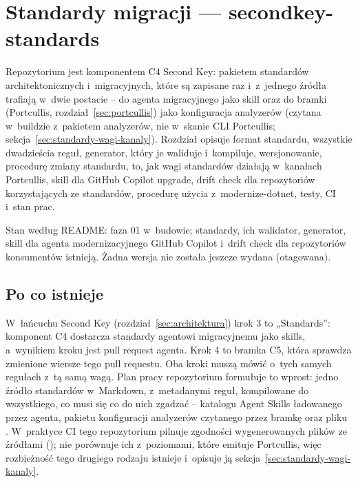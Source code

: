 \section{Standardy migracji --- secondkey-standards}\label{sec:standardy}

Repozytorium  jest komponentem C4 Second Key:
pakietem standardów architektonicznych i~migracyjnych, które są zapisane raz i~z~jednego
źródła trafiają w~dwie postacie -- do agenta migracyjnego jako skill oraz do bramki
(Portcullis, rozdział~\ref{sec:portcullis}) jako konfiguracja analyzerów (czytana w~buildzie
z~pakietem analyzerów, nie w~skanie CLI Portcullis; sekcja~\ref{sec:standardy-wagi-kanaly}).
Rozdział opisuje format standardu, wszystkie dwadzieścia reguł, generator, który je waliduje
i~kompiluje, wersjonowanie, procedurę zmiany standardu, to, jak wagi standardów działają
w~kanałach Portcullis, skill dla GitHub Copilot upgrade, drift check dla repozytoriów
korzystających ze standardów, procedurę użycia z~modernize-dotnet, testy, CI i~stan prac.

Stan według README: faza 01 w~budowie; standardy, ich walidator, generator, skill dla agenta
modernizacyjnego GitHub Copilot i~drift check dla repozytoriów konsumentów istnieją. Żadna
wersja nie została jeszcze wydana (otagowana).


\subsection{Po co istnieje}\label{sec:standardy-cel}

W~łańcuchu Second Key (rozdział~\ref{sec:architektura}) krok 3 to „Standards”: komponent C4
dostarcza standardy agentowi migracyjnemu jako skills, a~wynikiem kroku jest pull request
agenta. Krok 4 to bramka C5, która sprawdza zmienione wiersze tego pull requestu. Oba kroki
muszą mówić o~tych samych regułach z~tą samą wagą. Plan pracy repozytorium formułuje to
wprost: jedno źródło standardów w~Markdown, z~metadanymi reguł, kompilowane do wszystkiego,
co musi się co do nich zgadzać -- katalogu Agent Skills ładowanego przez agenta, pakietu
konfiguracji analyzerów czytanego przez bramkę oraz pliku .
 W~praktyce CI tego repozytorium pilnuje zgodności
wygenerowanych plików ze źródłami (); nie porównuje ich
z~poziomami, które emituje Portcullis, więc rozbieżność tego drugiego rodzaju istnieje
i~opisuje ją sekcja~\ref{sec:standardy-wagi-kanaly}.

